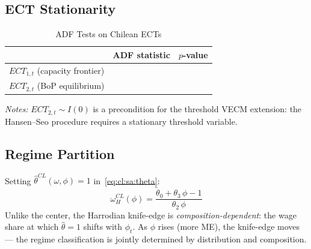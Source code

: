 \subsection{ECT Stationarity}
\label{app:cl:ect_stationarity}

\begin{table}[htbp]
\centering
\caption{ADF Tests on Chilean ECTs}
\label{tab:cl:sa:ect_adf}
\begin{threeparttable}
\begin{tabular}{lrr}
	\toprule
	& ADF statistic & $p$-value \\
	\midrule
	$ECT_{1,t}$ (capacity frontier) &  &  \\
	$ECT_{2,t}$ (BoP equilibrium)   &  &  \\
	\bottomrule
\end{tabular}
\begin{tablenotes}
	\small
	\item \textit{Notes:} $ECT_{2,t} \sim I(0)$ is a precondition
	for the threshold VECM extension: the Hansen--Seo procedure
	requires a stationary threshold variable.
\end{tablenotes}
\end{threeparttable}
\end{table}


\subsection{Regime Partition}
\label{app:cl:regime}

Setting $\hat{\theta}^{CL}(\omega, \phi) = 1$
in~\eqref{eq:cl:sa:theta}:
%
\begin{equation}
\omega_H^{CL}(\phi)
= \frac{\tilde{\theta}_0 + \theta_3\,\phi - 1}{\theta_2\,\phi}
\label{eq:cl:sa:omega_H}
\end{equation}
%
Unlike the center, the Harrodian knife-edge is \emph{composition-dependent}:
the wage share at which $\hat{\theta} = 1$ shifts with $\phi_t$.
As $\phi$ rises (more ME), the knife-edge moves --- the regime
classification is jointly determined by distribution and
composition.

